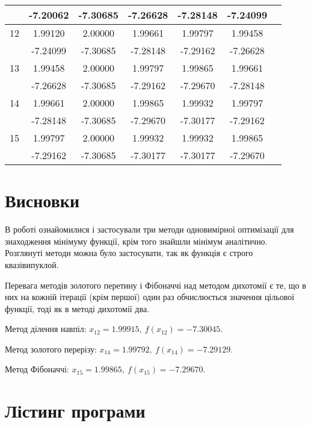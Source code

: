 \documentclass[14pt,a4paper]{extarticle}
\theoremstyle{definition}
\newcommand{\sep}{ , \ \allowbreak }
\begin{document}
\begin{center}
\begin{longtable}{| l |*6{ c |}}
    & -7.20062 & -7.30685 & -7.26628 & -7.28148 & -7.24099 \\\hline
 12 &  1.99120 &  2.00000 &  1.99661 &  1.99797 &  1.99458 \\*
    & -7.24099 & -7.30685 & -7.28148 & -7.29162 & -7.26628 \\\hline
 13 &  1.99458 &  2.00000 &  1.99797 &  1.99865 &  1.99661 \\*
    & -7.26628 & -7.30685 & -7.29162 & -7.29670 & -7.28148 \\\hline
 14 &  1.99661 &  2.00000 &  1.99865 &  1.99932 &  1.99797 \\*
    & -7.28148 & -7.30685 & -7.29670 & -7.30177 & -7.29162 \\\hline
 15 &  1.99797 &  2.00000 &  1.99932 &  1.99932 &  1.99865 \\*
    & -7.29162 & -7.30685 & -7.30177 & -7.30177 & -7.29670 \\\hline
\end{longtable}
\end{center}

\section{Висновки}
В роботі ознайомилися і застосували три методи одновимірної оптимізації для знаходження мінімуму функції, крім того знайшли мінімум аналітично. Розглянуті методи можна було застосувати, так як функція є строго квазівипуклой.

Перевага методів золотого перетину і Фібоначчі над методом дихотомії є те, що в них на кожній ітерації (крім першої) один раз обчислюється значення цільової функції, тоді як в методі дихотомії два.

Метод ділення навпіл:  $x_{12} = 1.99915 \sep f(x_{12}) = -7.30045$.

Метод золотого перерізу: $x_{14} = 1.99792 \sep f(x_{14}) = -7.29129$.

Метод Фібоначчі: $x_{15} = 1.99865 \sep f(x_{15}) = -7.29670$.

\section{Лістинг програми}
\end{document}
